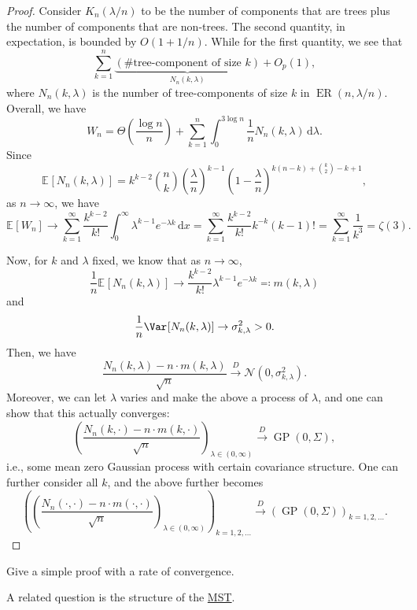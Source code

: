 \begin{proof}
	Consider \(K_n(\lambda / n)\) to be the number of components that are trees plus the number of components that are non-trees. The second quantity, in expectation, is bounded by \(O(1+ 1 / n)\). While for the first quantity, we see that
	\[
		\sum_{k=1}^{n} \underbrace{( \text{\#tree-component of size \(k\)} )}_{N_n(k, \lambda )} + O_p(1),
	\]
	where \(N_n(k, \lambda )\) is the number of tree-components of size \(k\) in \(\operatorname{ER}(n, \lambda / n) \). Overall, we have
	\[
		W_n
		= \Theta \left( \frac{\log n}{n} \right) + \sum_{k=1}^{n} \int_{0}^{3 \log n} \frac{1}{n} N_n(k, \lambda ) \,\mathrm{d}\lambda.
	\]
	Since
	\[
		\mathbb{E}_{}[N_n(k, \lambda )]
		= k^{k-2} \binom{n}{k} \left( \frac{\lambda}{n} \right) ^{k-1} \left( 1 - \frac{\lambda}{n} \right) ^{k(n-k) + \binom{k}{2} - k + 1},
	\]
	as \(n \to \infty \), we have
	\[
		\mathbb{E}_{}[W_n]
		\to \sum_{k=1}^{\infty} \frac{k^{k-2}}{k!} \int_{0}^{\infty} \lambda ^{k-1} e^{-\lambda k} \,\mathrm{d}x
		= \sum_{k=1}^{\infty} \frac{k^{k-2}}{k!} k^{- k} (k-1)!
		= \sum_{k=1}^{\infty} \frac{1}{k^3}
		= \zeta (3).
	\]

	Now, for \(k\) and \(\lambda \) fixed, we know that as \(n \to \infty \),
	\[
		\frac{1}{n}\mathbb{E}_{}[N_n(k, \lambda )]
		\to \frac{k^{k-2}}{k!} \lambda ^{k-1} e^{-\lambda k}
		\eqqcolon m(k, \lambda )
	\]
	and
	\[
		\frac{1}{n} \Var_{}[N_n(k, \lambda )]
		\to \sigma _{k, \lambda }^2
		> 0.
	\]
	Then, we have
	\[
		\frac{N_n(k, \lambda ) - n \cdot m(k, \lambda )}{\sqrt{n} }
		\overset{D}{\to} \mathcal{N} (0, \sigma _{k, \lambda }^2).
	\]
	Moreover, we can let \(\lambda \) varies and make the above a process of \(\lambda \), and one can show that this actually converges:
	\[
		\left( \frac{N_n(k, \cdot ) - n \cdot m(k, \cdot )}{\sqrt{n} } \right) _{\lambda \in (0, \infty )}
		\overset{D}{\to} \operatorname{GP}(0, \Sigma ),
	\]
	i.e., some mean zero Gaussian process with certain covariance structure. One can further consider all \(k\), and the above further becomes
	\[
		\left( \left( \frac{N_n(\cdot , \cdot ) - n \cdot m(\cdot, \cdot )}{\sqrt{n} } \right) _{\lambda \in (0, \infty )} \right) _{k = 1, 2, \dots }
		\overset{D}{\to} \left( \operatorname{GP}(0, \Sigma ) \right) _{k = 1, 2, \dots }.
	\]
\end{proof}

\begin{exercise}
	Give a simple proof with a rate of convergence.
\end{exercise}

\begin{remark}
	A related question is the structure of the \hyperref[prb:MST]{MST}.
\end{remark}

